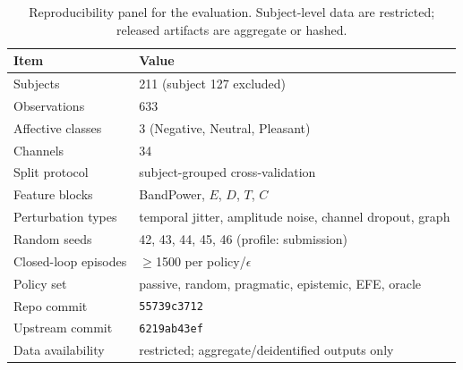 \begin{table}[t]\centering
\caption{Reproducibility panel for the evaluation. Subject-level data are restricted; released artifacts are aggregate or hashed.}
\label{tab:reproducibility}
\begin{tabular}{ll}
\toprule
Item & Value \\
\midrule
Subjects & 211 (subject 127 excluded) \\
Observations & 633 \\
Affective classes & 3 (Negative, Neutral, Pleasant) \\
Channels & 34 \\
Split protocol & subject-grouped cross-validation \\
Feature blocks & BandPower, $E$, $D$, $T$, $C$ \\
Perturbation types & temporal jitter, amplitude noise, channel dropout, graph \\
Random seeds & 42, 43, 44, 45, 46 (profile: submission) \\
Closed-loop episodes & $\geq$1500 per policy/$\epsilon$ \\
Policy set & passive, random, pragmatic, epistemic, EFE, oracle \\
Repo commit & \texttt{55739c3712} \\
Upstream commit & \texttt{6219ab43ef} \\
Data availability & restricted; aggregate/deidentified outputs only \\
\bottomrule
\end{tabular}
\end{table}
